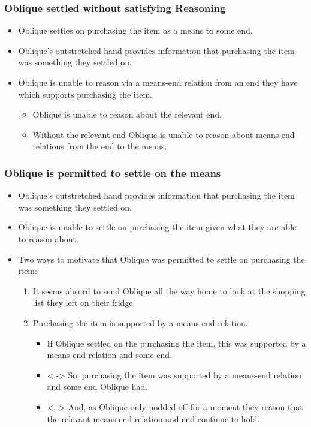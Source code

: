\documentclass[noamssymb,
graphics,
]{beamer} %
\newcommand{\hand}{\ding{43}}
\newcommand{\schemaName}[1]{\textsf{#1}}
\begin{document}
\begin{frame}
  \frametitle{Oblique settled without satisfying \schemaName{Reasoning}}

  \begin{itemize}
  \item Oblique settles on purchasing the item as a means to some end.
  \item Oblique's outstretched hand provides information that purchasing the item was something they settled on.
  \item[\hand] Oblique is unable to reason via a means-end relation from an end they have which supports purchasing the item.
    \begin{itemize}
    \item Oblique is unable to reason about the relevant end.
    \item Without the relevant end Oblique is unable to reason about means-end relations from the end to the means.
    \end{itemize}
  \end{itemize}

\end{frame}


\begin{frame}
  \frametitle{Oblique is permitted to settle on the means}

  \begin{itemize}
  \item<+-> Oblique's outstretched hand provides information that purchasing the item was something they settled on.
  \item<+-> Oblique is unable to settle on purchasing the item given what they are able to reason about.
  \item<+-> Two ways to motivate that Oblique was permitted to settle on purchasing the item:
    \begin{enumerate}
    \item<+> It seems absurd to send Oblique all the way home to look at the shopping list they left on their fridge.
    \item<+-> Purchasing the item is supported by a means-end relation.
      \begin{itemize}
      \item<+-> If Oblique settled on the purchasing the item, this was supported by a means-end relation and some end.
      \item<.-> So, purchasing the item was supported by a means-end relation and some end Oblique had.
      \item<.-> And, as Oblique only nodded off for a moment they reason that the relevant means-end relation and end continue to hold.
      \end{itemize}
    \end{enumerate}
  \end{itemize}

\end{frame}
\end{document}

